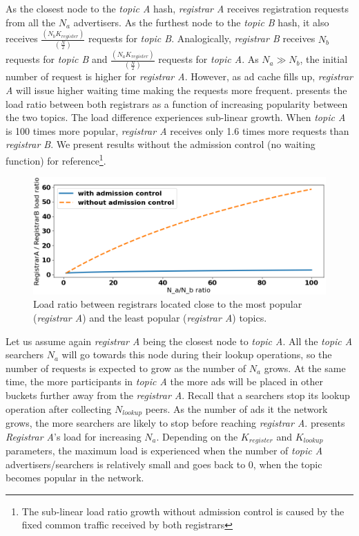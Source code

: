 As the closest node to the \emph{topic A} hash, \emph{registrar A} receives registration requests from all the $N_a$ advertisers. As the furthest node to the \emph{topic B} hash, it also receives $\frac{(N_{b}K_\textit{register})}{(\frac{N}{2})}$ requests for \emph{topic B}. Analogically, \emph{registrar B} receives $N_b$ requests for \emph{topic B} and $\frac{(N_{a}K_\textit{register})}{(\frac{N}{2})}$ requests for \emph{topic A}. As $N_a \gg N_b$, the initial number of request is higher for \emph{registrar A}. However, as ad cache fills up, \emph{registrar A} will issue higher waiting time making the requests more frequent.  presents the load ratio between both registrars as a function of increasing popularity between the two topics. The load difference experiences sub-linear growth. When \emph{topic A} is 100 times more popular, \emph{registrar A} receives only 1.6 times more requests than \emph{registrar B}. We present results without the admission control (\ie no waiting function) for reference\footnote{The sub-linear load ratio growth without admission control is caused by the fixed common traffic received by both registrars}. 

\begin{figure}[t]
    \includegraphics[width=1\linewidth]{img/fairness_registration}
    \caption{Load ratio between registrars located close to the most popular (\emph{registrar A}) and the least popular (\emph{registrar A}) topics.
    }
    \label{fig:fairness_registration}
\end{figure}

Let us assume again \emph{registrar A} being the closest node to \emph{topic A}. All the \emph{topic A} searchers $N_a$ will go towards this node during their lookup operations, so the number of requests is expected to grow as the number of $N_a$ grows. At the same time, the more participants in \emph{topic A} the more ads will be placed in other buckets further away from the \emph{registrar A}. Recall that a searchers stop its lookup operation after collecting $N_{lookup}$ peers. As the number of ads it the network grows, the more searchers are likely to stop before reaching \emph{registrar A}.  presents \emph{Registrar A}'s load for increasing $N_a$. Depending on the $K_{register}$ and $K_{lookup}$ parameters, the maximum load is experienced when the number of \emph{topic A} advertisers/searchers is relatively small and goes back to $0$, when the topic becomes popular in the network. 

